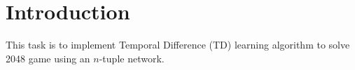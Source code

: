 \chapter{Introduction}
\indent
	This task is to implement Temporal Difference (TD) learning algorithm to solve 2048 game using an $n$-tuple network.
